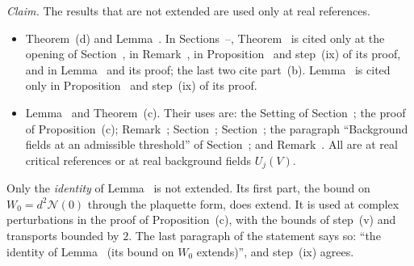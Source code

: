 \begin{detail}\label{xa:d-notext}
\emph{Claim.} The results that are not extended are used only at real references.
\begin{itemize}
\item Theorem~(d) and Lemma~. In Sections~--, Theorem~ is cited only at the opening of Section~, in Remark~, in Proposition~ and step~(ix) of its proof, and in Lemma~ and its proof; the last two cite part~(b). Lemma~ is cited only in Proposition~ and step~(ix) of its proof.
\item Lemma~ and Theorem~(c). Their uses are: the Setting of Section~; the proof of Proposition~(c); Remark~; Section~; Section~; the paragraph ``Background fields at an admissible threshold'' of Section~; and Remark~. All are at real critical references or at real background fields $U_j(V)$.
\end{itemize}
Only the \emph{identity} of Lemma~ is not extended. Its first part, the bound on $W_0=d^2\mathcal N(0)$ through the plaquette form, does extend. It is used at complex perturbations in the proof of Proposition~(c), with the bounds of step~(v) and transports bounded by $2$. The last paragraph of the statement says so: ``the identity of Lemma~ (its bound on $W_0$ extends)'', and step~(ix) agrees.
\end{detail}

